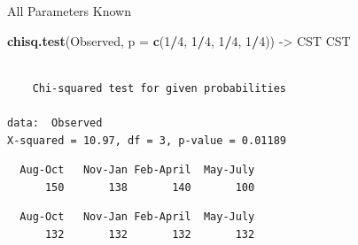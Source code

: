 \documentclass[
  ignorenonframetext,
]{beamer}
\newenvironment{Shaded}{\begin{snugshade}}{\end{snugshade}}
\newcommand{\AttributeTok}[1]{\textcolor[rgb]{0.13,0.29,0.53}{#1}}
\newcommand{\DecValTok}[1]{\textcolor[rgb]{0.00,0.00,0.81}{#1}}
\newcommand{\FunctionTok}[1]{\textcolor[rgb]{0.13,0.29,0.53}{\textbf{#1}}}
\newcommand{\NormalTok}[1]{#1}
\newcommand{\OtherTok}[1]{\textcolor[rgb]{0.56,0.35,0.01}{#1}}
\newcommand{\SpecialCharTok}[1]{\textcolor[rgb]{0.81,0.36,0.00}{\textbf{#1}}}
\begin{document}
\begin{frame}[fragile]{All Parameters Known}
\label{all-parameters-known-3}
\begin{Shaded}
\begin{Highlighting}[]
\FunctionTok{chisq.test}\NormalTok{(Observed, }\AttributeTok{p =} \FunctionTok{c}\NormalTok{(}\DecValTok{1}\SpecialCharTok{/}\DecValTok{4}\NormalTok{, }\DecValTok{1}\SpecialCharTok{/}\DecValTok{4}\NormalTok{, }\DecValTok{1}\SpecialCharTok{/}\DecValTok{4}\NormalTok{, }\DecValTok{1}\SpecialCharTok{/}\DecValTok{4}\NormalTok{)) }\OtherTok{{-}\textgreater{}}\NormalTok{ CST}
\NormalTok{CST}
\end{Highlighting}
\end{Shaded}

\begin{verbatim}

    Chi-squared test for given probabilities

data:  Observed
X-squared = 10.97, df = 3, p-value = 0.01189
\end{verbatim}

\begin{Shaded}
\end{Shaded}

\begin{verbatim}
  Aug-Oct   Nov-Jan Feb-April  May-July 
      150       138       140       100 
\end{verbatim}

\begin{Shaded}
\end{Shaded}

\begin{verbatim}
  Aug-Oct   Nov-Jan Feb-April  May-July 
      132       132       132       132 
\end{verbatim}
\end{frame}
\end{document}
